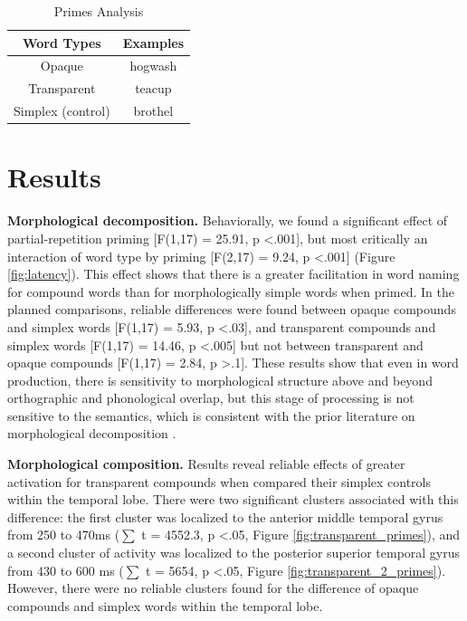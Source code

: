 \documentclass{frontiersSCNS}
\begin{document}
\begin{table}
\centering{}%
\begin{tabular}{|c|c|}
\hline
Word Types & Examples\tabularnewline
\hline
\hline
Opaque & hogwash\tabularnewline
\hline
Transparent & teacup\tabularnewline
\hline
Simplex (control) & brothel\tabularnewline
\hline
\end{tabular}\caption{\label{tab:Primes-Analysis} Primes Analysis}
\end{table}

\section{Results}
 
\textbf{Morphological decomposition.} Behaviorally, we found a significant effect of partial-repetition priming [F(1,17) = 25.91, p \textless .001], but most critically an interaction of word type by priming [F(2,17) = 9.24, p \textless .001] (Figure \ref{fig:latency}). This effect shows that there is a greater facilitation in word naming for compound words than for morphologically simple words when primed. In the planned comparisons, reliable differences were found between opaque compounds and simplex words [F(1,17) = 5.93, p \textless .03], and transparent compounds and simplex words [F(1,17) = 14.46, p \textless .005] but not between transparent and opaque compounds [F(1,17) = 2.84, p \textgreater .1]. These results show that even in word production, there is sensitivity to morphological structure above and beyond orthographic and phonological overlap, but this stage of processing is not sensitive to the semantics, which is consistent with the prior literature on morphological decomposition \citep{Rastle:2004, McCormick:2008}. 

\textbf{Morphological composition.} Results reveal reliable effects of greater activation for transparent compounds when compared their simplex controls within the temporal lobe. There were two significant clusters associated with this difference: the first cluster was  localized to the anterior middle temporal gyrus from 250 to 470ms ($\sum$ t = 4552.3, p \textless .05, Figure \ref{fig:transparent_primes}), and a second cluster of activity was localized to the posterior superior temporal gyrus from 430 to 600 ms ($\sum$ t = 5654, p \textless .05, Figure \ref{fig:transparent_2_primes}). However, there were no reliable clusters found for the difference of opaque compounds and simplex words within the temporal lobe.
\end{document}
